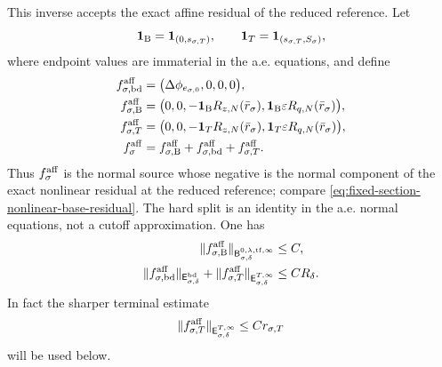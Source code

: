 \begin{theorem}
This inverse accepts the exact affine residual of the reduced reference.
Let
\begin{equation}
 \mathbf1_{\rm B}=\mathbf1_{(0,s_{\sigma,T})},
 \qquad
 \mathbf1_T=\mathbf1_{(s_{\sigma,T},S_\sigma)},             \label{eq:affine-hard-source-split}
\end{equation}
where endpoint values are immaterial in the a.e. equations, and define
\begin{align}
 f_{\sigma,\rm bd}^{\rm aff}
 &=\bigl(\Delta\phi_{e_{\sigma,0}},0,0,0\bigr),\notag\\
 f_{\sigma,\rm B}^{\rm aff}
 &=\bigl(0,0,-\mathbf1_{\rm B}R_{z,N}(\bar r_\sigma),
            \mathbf1_{\rm B}\varepsilon R_{q,N}(\bar r_\sigma)\bigr),\notag\\
 f_{\sigma,T}^{\rm aff}
 &=\bigl(0,0,-\mathbf1_TR_{z,N}(\bar r_\sigma),
            \mathbf1_T\varepsilon R_{q,N}(\bar r_\sigma)\bigr),\notag\\
 f_\sigma^{\rm aff}
 &=f_{\sigma,\rm B}^{\rm aff}
      +f_{\sigma,\rm bd}^{\rm aff}
      +f_{\sigma,T}^{\rm aff}.                  \label{eq:affine-normal-source-decomposition}
\end{align}
Thus \(f_\sigma^{\rm aff}\) is the normal source whose negative is the
normal component of the exact nonlinear residual at the reduced reference;
compare \cref{eq:fixed-section-nonlinear-base-residual}.  The hard split is
an identity in the a.e. normal equations, not a cutoff approximation.  One
has
\begin{align}
 \|f_{\sigma,\rm B}^{\rm aff}\|_
  {\mathsf B_{\sigma,\delta}^{0,\lambda,
      \mathrm{tf},\infty}}
 &\le C,\notag\\
 \|f_{\sigma,\rm bd}^{\rm aff}\|_
  {\mathsf E_{\sigma,\delta}^{\rm bd}}
 +\|f_{\sigma,T}^{\rm aff}\|_
  {\mathsf E_{\sigma,\delta}^{T,\infty}}
 &\le C R_\delta.                               \label{eq:affine-source-summand-bounds}
\end{align}
In fact the sharper terminal estimate
\begin{equation}
 \|f_{\sigma,T}^{\rm aff}\|_
   {\mathsf E_{\sigma,\delta}^{T,\infty}}
 \le C r_{\sigma,T}                             \label{eq:affine-terminal-source-sharp-bound}
\end{equation}
will be used below.


\end{theorem}
